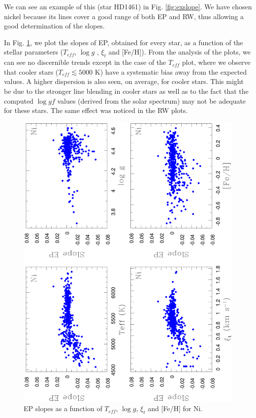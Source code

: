 \documentclass[oldversion]{aa}
\begin{document}
We can see an example of this (star HD1461) in Fig. \ref{fig:exslope}. We have chosen nickel because its lines cover a good range of both EP and RW, thus allowing a good determination of the slopes.



In Fig. \ref{fig:slopeEP}, we plot the slopes of EP, obtained for every star, as a function of the stellar parameters ($T_{eff}$, $\log g$ , $\xi_t$ and [Fe/H]). From the analysis of the plots, we can see no discernible trends except in the case of the $T_{eff}$ plot, where we observe that cooler stars ($T_{eff}\lesssim 5000$ K) have a systematic bias away from the expected values. A higher dispersion is also seen, on average, for cooler stars. This might be due to the stronger line blending in cooler stars as well as to the fact that the computed $\log gf$ values (derived from the solar spectrum) may not be adequate for these stars. The same effect was noticed in the RW plots.



\begin{figure}[t]
\centering
\includegraphics[angle=-90, trim=8mm 0mm 5mm 10mm, clip,width=9 cm]{pics/EPpaper.eps}
\caption[]{EP slopes as a function of $T_{eff}$, $\log g$, $\xi_t$ and [Fe/H] for Ni.}
\label{fig:slopeEP}
\end{figure}
\end{document}
